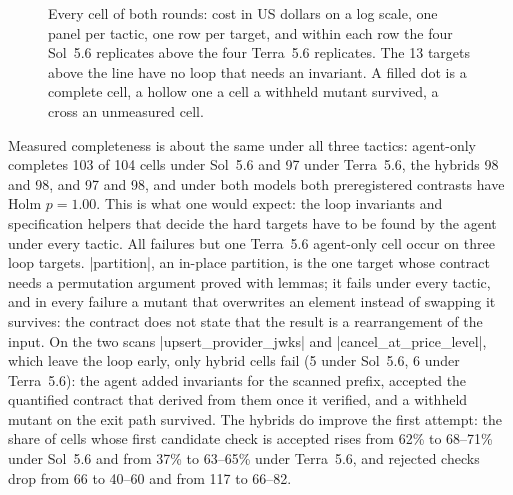 \begin{figure}[t]
\caption{Every cell of both rounds: cost in US dollars on a log scale, one panel per tactic, one row per target, and within each row the four Sol~5.6 replicates above the four Terra~5.6 replicates. The 13 targets above the line have no loop that needs an invariant. A filled dot is a complete cell, a hollow one a cell a withheld mutant survived, a cross an unmeasured cell.}
\label{fig:cells}
\end{figure}

Measured completeness is about the same under all three tactics: agent-only completes 103 of 104 cells under Sol~5.6 and 97 under Terra~5.6, the hybrids 98 and 98, and 97 and 98, and under both models both preregistered contrasts have Holm $p = 1.00$.
This is what one would expect: the loop invariants and specification helpers that decide the hard targets have to be found by the agent under every tactic.
All failures but one Terra~5.6 agent-only cell occur on three loop targets.
|partition|, an in-place partition, is the one target whose contract needs a permutation argument proved with lemmas; it fails under every tactic, and in every failure a mutant that overwrites an element instead of swapping it survives: the contract does not state that the result is a rearrangement of the input.
On the two scans |upsert_provider_jwks| and |cancel_at_price_level|, which leave the loop early, only hybrid cells fail (5 under Sol~5.6, 6 under Terra~5.6): the agent added invariants for the scanned prefix, accepted the quantified contract that \WP derived from them once it verified, and a withheld mutant on the exit path survived.
The hybrids do improve the first attempt: the share of cells whose first candidate check is accepted rises from 62\% to 68--71\% under Sol~5.6 and from 37\% to 63--65\% under Terra~5.6, and rejected checks drop from 66 to 40--60 and from 117 to 66--82.

